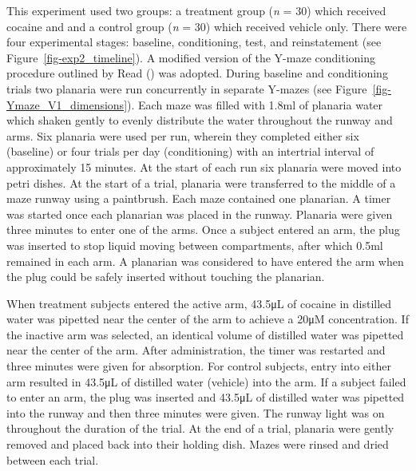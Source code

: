 \documentclass[
  jou,
  floatsintext,
  longtable,
  nolmodern,
  notxfonts,
  notimes,
  donotrepeattitle,
  colorlinks=true,linkcolor=blue,citecolor=blue,urlcolor=blue]{apa7}
\begin{document}
This experiment used two groups: a treatment group (\emph{n} = 30) which
received cocaine and and a control group (\emph{n} = 30) which received
vehicle only. There were four experimental stages: baseline,
conditioning, test, and reinstatement (see
Figure~\ref{fig-exp2_timeline}). A modified version of the Y-maze
conditioning procedure outlined by Read
() was adopted. During
baseline and conditioning trials two planaria were run concurrently in
separate Y-mazes (see Figure~\ref{fig-Ymaze_V1_dimensions}). Each maze
was filled with 1.8ml of planaria water which shaken gently to evenly
distribute the water throughout the runway and arms. Six planaria were
used per run, wherein they completed either six (baseline) or four
trials per day (conditioning) with an intertrial interval of
approximately 15 minutes. At the start of each run six planaria were
moved into petri dishes. At the start of a trial, planaria were
transferred to the middle of a maze runway using a paintbrush. Each maze
contained one planarian. A timer was started once each planarian was
placed in the runway. Planaria were given three minutes to enter one of
the arms. Once a subject entered an arm, the
plug was inserted to stop liquid moving between compartments, after
which 0.5ml remained in each arm. A planarian was considered
to have entered the arm when the plug could be safely inserted without
touching the planarian.

When treatment subjects entered the active arm, 43.5μL of cocaine in
distilled water was pipetted near the center of the arm to achieve a
20μM concentration. If the inactive arm was selected, an identical
volume of distilled water was pipetted near the center of the arm. After
administration, the timer was restarted and three minutes were given for
absorption. For control subjects, entry into either arm resulted in
43.5μL of distilled water (vehicle) into the arm. If a subject failed to
enter an arm, the plug was inserted and 43.5μL of distilled water was
pipetted into the runway and then three minutes were given. The runway
light was on throughout the duration of the trial. At the end of a
trial, planaria were gently removed and placed back into their holding
dish. Mazes were rinsed and dried between each trial.
\end{document}
